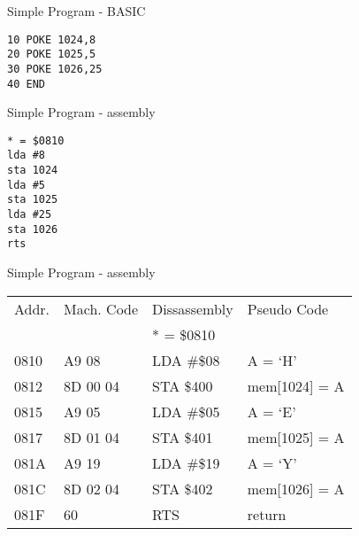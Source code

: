 \documentclass[aspectratio=43]{uva-inf-presentation}
\begin{document}

\begin{frame}[fragile]{Simple Program - BASIC}

\begin{lstlisting}
10 POKE 1024,8
20 POKE 1025,5
30 POKE 1026,25
40 END
\end{lstlisting}

\end{frame}


\begin{frame}[fragile]{Simple Program - assembly}

\begin{lstlisting}
* = $0810
lda #8
sta 1024
lda #5
sta 1025
lda #25
sta 1026
rts
\end{lstlisting}

\end{frame}


\begin{frame}{Simple Program - assembly}

\begin{tabular}{l|l|l|l}
Addr. & Mach. Code & Dissassembly & Pseudo Code \\
 & & * = \$0810 & \\
0810 & A9 08 & LDA \#\$08 & A = `H' \\
0812 & 8D 00 04 & STA \$400 & mem[1024] = A \\
0815 & A9 05 & LDA \#\$05 & A = `E' \\
0817 & 8D 01 04 & STA \$401 & mem[1025] = A \\
081A & A9 19 & LDA \#\$19 & A = `Y' \\
081C & 8D 02 04 & STA \$402 & mem[1026] = A \\
081F & 60 & RTS & return \\
\end{tabular}

\end{frame}







\end{document}
